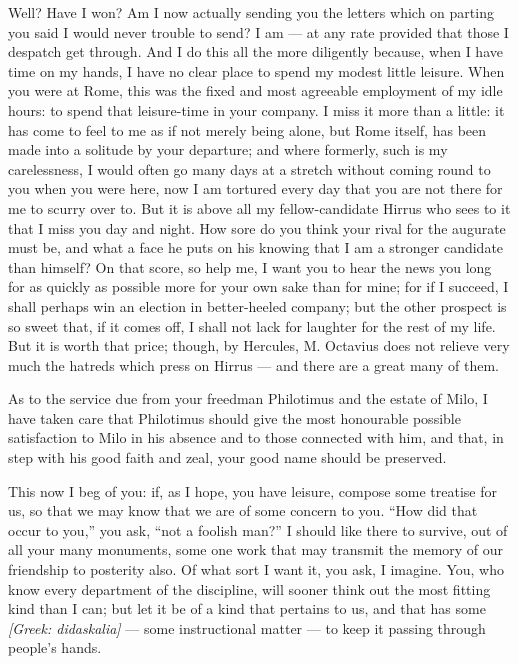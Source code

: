 

 Well? Have I won? Am I now actually sending you the letters which on parting you said I would never trouble to send? I am --- at any rate provided that those I despatch get through. And I do this all the more diligently because, when I have time on my hands, I have no clear place to spend my modest little leisure. When you were at Rome, this was the fixed and most agreeable employment of my idle hours: to spend that leisure-time in your company. I miss it more than a little: it has come to feel to me as if not merely being alone, but Rome itself, has been made into a solitude by your departure; and where formerly, such is my carelessness, I would often go many days at a stretch without coming round to you when you were here, now I am tortured every day that you are not there for me to scurry over to. But it is above all my fellow-candidate Hirrus who sees to it that I miss you day and night. How sore do you think your rival for the augurate must be, and what a face he puts on his knowing that I am a stronger candidate than himself? On that score, so help me, I want you to hear the news you long for as quickly as possible more for your own sake than for mine; for if I succeed, I shall perhaps win an election in better-heeled company; but the other prospect is so sweet that, if it comes off, I shall not lack for laughter for the rest of my life. \textdagger But it is worth that price\textdagger; though, by Hercules, M. Octavius does not relieve very much the hatreds which press on Hirrus --- and there are a great many of them.

 As to the service due from your freedman Philotimus and the estate of Milo, I have taken care that Philotimus should give the most honourable possible satisfaction to Milo in his absence and to those connected with him, and that, in step with his good faith and zeal, your good name should be preserved.

 This now I beg of you: if, as I hope, you have leisure, compose some treatise for us, so that we may know that we are of some concern to you. ``How did that occur to you,'' you ask, ``not a foolish man?'' I should like there to survive, out of all your many monuments, some one work that may transmit the memory of our friendship to posterity also. Of what sort I want it, you ask, I imagine. You, who know every department of the discipline, will sooner think out the most fitting kind than I can; but let it be of a kind that pertains to us, and that has some \textit{[Greek: didaskalia]} --- some instructional matter --- to keep it passing through people's hands.
